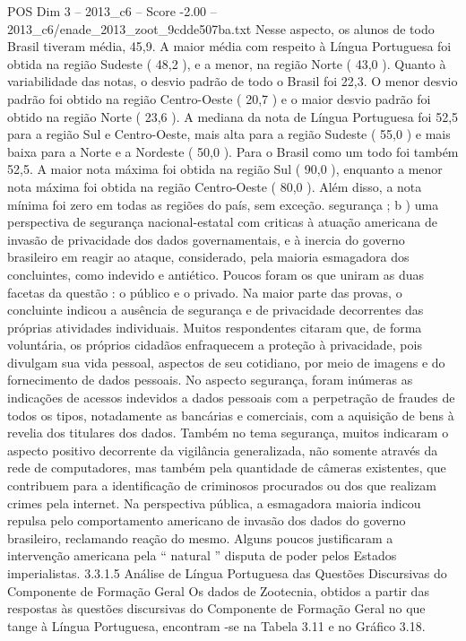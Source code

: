 \begin{textsample}{POS Dim 3 – 2013\_c6 – Score -2.00 – 2013\_c6/enade\_2013\_zoot\_9cdde507ba.txt}
Nesse aspecto, os alunos de todo Brasil tiveram média, 45,9.
A maior média com respeito à Língua Portuguesa foi obtida na região Sudeste ( 48,2 ), e a menor, na região Norte ( 43,0 ).
Quanto à variabilidade das notas, o desvio padrão de todo o Brasil foi 22,3.
O menor desvio padrão foi obtido na região Centro-Oeste ( 20,7 ) e o maior desvio padrão foi obtido na região Norte ( 23,6 ).
A mediana da nota de Língua Portuguesa foi 52,5 para a região Sul e Centro-Oeste, mais alta para a região Sudeste ( 55,0 ) e mais baixa para a Norte e a Nordeste ( 50,0 ).
Para o Brasil como um todo foi também 52,5.
A maior nota máxima foi obtida na região Sul ( 90,0 ), enquanto a menor nota máxima foi obtida na região Centro-Oeste ( 80,0 ).
Além disso, a nota mínima foi zero em todas as regiões do país, sem exceção. segurança ; b ) uma perspectiva de segurança nacional-estatal com criticas à atuação americana de invasão de privacidade dos dados governamentais, e à inercia do governo brasileiro em reagir ao ataque, considerado, pela maioria esmagadora dos concluintes, como indevido e antiético.
Poucos foram os que uniram as duas facetas da questão : o público e o privado.
Na maior parte das provas, o concluinte indicou a ausência de segurança e de privacidade decorrentes das próprias atividades individuais.
Muitos respondentes citaram que, de forma voluntária, os próprios cidadãos enfraquecem a proteção à privacidade, pois divulgam sua vida pessoal, aspectos de seu cotidiano, por meio de imagens e do fornecimento de dados pessoais.
No aspecto segurança, foram inúmeras as indicações de acessos indevidos a dados pessoais com a perpetração de fraudes de todos os tipos, notadamente as bancárias e comerciais, com a aquisição de bens à revelia dos titulares dos dados.
Também no tema segurança, muitos indicaram o aspecto positivo decorrente da vigilância generalizada, não somente através da rede de computadores, mas também pela quantidade de câmeras existentes, que contribuem para a identificação de criminosos procurados ou dos que realizam crimes pela internet.
Na perspectiva pública, a esmagadora maioria indicou repulsa pelo comportamento americano de invasão dos dados do governo brasileiro, reclamando reação do mesmo.
Alguns poucos justificaram a intervenção americana pela “ natural ” disputa de poder pelos Estados imperialistas. 3.3.1.5 Análise de Língua Portuguesa das Questões Discursivas do Componente de Formação Geral Os dados de Zootecnia, obtidos a partir das respostas às questões discursivas do Componente de Formação Geral no que tange à Língua Portuguesa, encontram -se na Tabela 3.11 e no Gráfico 3.18.

\end{textsample}
